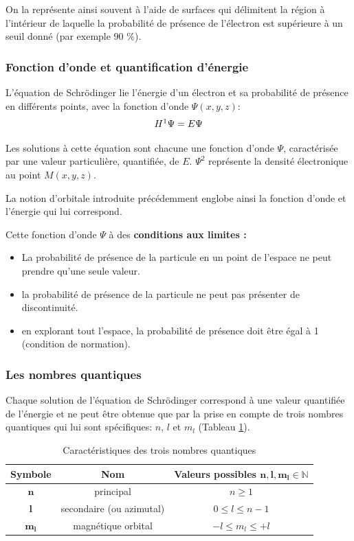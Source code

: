 \documentclass{article}
\begin{document}
On la représente ainsi souvent à l'aide de surfaces qui délimitent la région à
l'intérieur de laquelle la probabilité de présence de l'électron est supérieure
à un seuil donné (par exemple 90 \%).

\subsubsection{Fonction d'onde et quantification d'énergie}

L'équation de Schrödinger lie l'énergie d'un électron et sa probabilité de présence
en différents points, avec la fonction d'onde $\Psi(x, y, z)$:
$$H\footnote{$H$ est un opérateur mathématique (Hamiltonien).}\Psi = E\Psi$$

Les solutions à cette équation sont chacune une fonction d'onde $\Psi$, caractérisée
par une valeur particulière, quantifiée, de $E$. 
$\Psi^2$ représente la densité électronique au point $M(x,y,z)$. 

La notion d'orbitale introduite précédemment englobe ainsi la fonction d'onde et l'énergie qui lui correspond.

\noindent
Cette fonction d'onde $\Psi$ à des \textbf{conditions aux limites :}
\begin{itemize}[label=$\ast$]
    \item La probabilité de présence de la particule en un point de l'espace ne peut prendre qu'une seule valeur. 
    \item la probabilité de présence de la particule ne peut pas présenter de discontinuité. 
    \item en explorant tout l'espace, la probabilité de présence doit être égal à 1 (condition de normation). 
\end{itemize}

\subsubsection{Les nombres quantiques}

Chaque solution de l'équation de Schrödinger correspond à une valeur quantifiée de
l'énergie et ne peut être obtenue que par la prise en compte de trois nombres quantiques
qui lui sont spécifiques: $n$, $l$  et $m_l$  (Tableau \ref{tab:Caractéristiques des trois nombres quantiques}).

\begin{table}[h]
    \centering
    \begin{tabular}{|c|c|c|}
    \hline
        \textbf{Symbole} & \textbf{Nom}  & \makecell{\textbf{Valeurs possibles} \\ $\pmb{n,l,m_l \in \mathbb{N}}$} \\ \hline
        $\bm{n}$ & principal & $n\ge 1$ \\ \hline
        $\bm{l}$ & secondaire (ou azimutal) & $0 \le l \le n-1$ \\ \hline
        $\bm{m_l}$ & magnétique orbital & $-l \le m_l \le +l$ \\ \hline
    \end{tabular}
    \caption{Caractéristiques des trois nombres quantiques}
    \label{tab:Caractéristiques des trois nombres quantiques}
\end{table}
\end{document}
